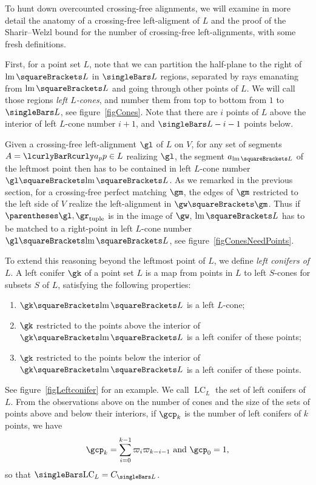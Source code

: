 \documentclass[10pt, a4paper, twoside]{basestyle}
\DeclareMathOperator{\leftmost}{lm}
\DeclareMathOperator{\LC}{LC}
\begin{document}
To hunt down overcounted crossing-free alignments, we will examine in more detail the anatomy of a crossing-free
left-aligment of $L$ and the proof of the Sharir--Welzl bound for the number of crossing-free left-alignments,
with some fresh definitions.

First, for a point set $L$, note that we can partition the half-plane to the right of $\leftmost\of L$ in
$\Cardinality L$ regions,
separated by rays emanating from $\leftmost\of L$ and going through other points of $L$. We will call those regions
\emph{left $L$-cones}, and number them from top to bottom from $1$ to $\Cardinality L$, see figure~\ref{figCones}.
Note that there are $i$ points of $L$ above the interior of left $L$-cone
number $i+1$, and $\Cardinality L - i - 1$ points below.

Given a crossing-free left-alignment $\gl$ of $L$ on $V$, for any set of segments $A=\setst{a_p}{p\in L}$
realizing $\gl$, the segment $a_{\leftmost\of L}$ of the leftmost point then has to be contained in left
$L$-cone number $\gl\of{\leftmost\of L}$.
As we remarked in the previous section, for a crossing-free perfect matching $\gm$, the edges of $\gm$ restricted
to the left side of $V$ realize the left-alignment in $\gw\of\gm$. Thus if $\tuple{\gl, \gr}$ is in the image of
$\gw$, $\leftmost\of L$ has to be matched to a right-point in left $L$-cone number $\gl\of{\leftmost\of L}$, see
figure~\ref{figConesNeedPoints}.

To extend this reasoning beyond the leftmost point of $L$, we define \emph{left conifers of $L$}.
A left conifer $\gk$ of a point set $L$ is a map from points in $L$ to left $S$-cones for subsets $S$ of $L$,
satisfying the following properties:
\begin{enumerate}
\item $\gk\of{\leftmost\of L}$ is a left $L$-cone;
\item $\gk$ restricted to the points above the interior of $\gk\of{\leftmost\of L}$ is a left conifer of these points;
\item $\gk$ restricted to the points below the interior of $\gk\of{\leftmost\of L}$ is a left conifer of these points.
\end{enumerate}
See figure~\ref{figLeftconifer} for an example.
We call $\LC_L$ the set of left conifers of $L$. From the observations above on the number of cones and the
size of the sets of points above and below their interiors, if $\gcp_k$ is the number of left conifers of $k$ points,
we have
\[
\gcp_k=\sum{i=0}[k-1]\varpi_{i}\varpi_{k-i-1} \text{ and } \gcp_0=1\text,
\]
so that $\Cardinality{\LC_L} = C_{\Cardinality L}$.
\end{document}
